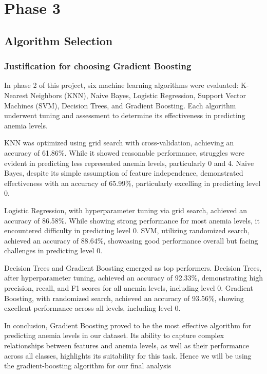 \chapter{Phase 3}


\section{Algorithm Selection}


\subsection{Justification for choosing Gradient Boosting}

In phase 2 of this project, six machine learning algorithms were evaluated: K-Nearest Neighbors (KNN), Naive Bayes, Logistic Regression, Support Vector Machines (SVM), Decision Trees, and Gradient Boosting. Each algorithm underwent tuning and assessment to determine its effectiveness in predicting anemia levels.

KNN was optimized using grid search with cross-validation, achieving an accuracy of 61.86\%. While it showed reasonable performance, struggles were evident in predicting less represented anemia levels, particularly 0 and 4. Naive Bayes, despite its simple assumption of feature independence, demonstrated effectiveness with an accuracy of 65.99\%, particularly excelling in predicting level 0.

Logistic Regression, with hyperparameter tuning via grid search, achieved an accuracy of 86.58\%. While showing strong performance for most anemia levels, it encountered difficulty in predicting level 0. SVM, utilizing randomized search, achieved an accuracy of 88.64\%, showcasing good performance overall but facing challenges in predicting level 0.

Decision Trees and Gradient Boosting emerged as top performers. Decision Trees, after hyperparameter tuning, achieved an accuracy of 92.33\%, demonstrating high precision, recall, and F1 scores for all anemia levels, including level 0. Gradient Boosting, with randomized search, achieved an accuracy of 93.56\%, showing excellent performance across all levels, including level 0.

In conclusion, Gradient Boosting proved to be the most effective algorithm for predicting anemia levels in our dataset. Its ability to capture complex relationships between features and anemia levels, as well as their performance across all classes, highlights its suitability for this task. Hence we will be using the gradient-boosting algorithm for our final analysis

